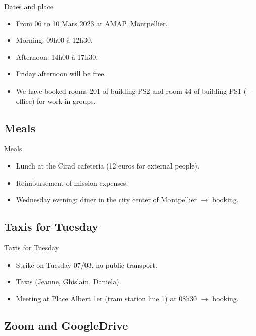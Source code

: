 \documentclass[10pt,table,dvipsnames,compress]{beamer}
\begin{document}
\begin{frame}[label={sec:orga02092d}]{Dates and place}
\begin{itemize}
\item From 06 to 10 Mars 2023 at AMAP, Montpellier.
\item Morning: 09h00 à 12h30.
\item Afternoon: 14h00 à 17h30.
\item Friday afternoon will be free.
\item We have booked rooms 201 of building PS2 and room 44 of building PS1 (+ office) for work in groups.
\end{itemize}
\end{frame}

\subsection{Meals}
\label{sec:orgeaf9ba2}

\begin{frame}[label={sec:orgf6f0bf3}]{Meals}
\begin{itemize}
\item Lunch at the Cirad cafeteria (12 euros for external people).
\item Reimbursement of mission expenses.
\item Wednesday evening: diner in the city center of Montpellier \newline \(\rightarrow\) booking.
\end{itemize}
\end{frame}

\subsection{Taxis for Tuesday}
\label{sec:orgfd5c751}

\begin{frame}[label={sec:org601f2a6}]{Taxis for Tuesday}
\begin{itemize}
\item Strike on Tuesday 07/03, no public transport.
\item Taxis (Jeanne, Ghislain, Daniela).
\item Meeting at Place Albert 1er (tram station line 1) at 08h30 \newline \(\rightarrow\) booking.
\end{itemize}
\end{frame}

\subsection{Zoom and GoogleDrive}
\label{sec:org879e9dd}
\end{document}
